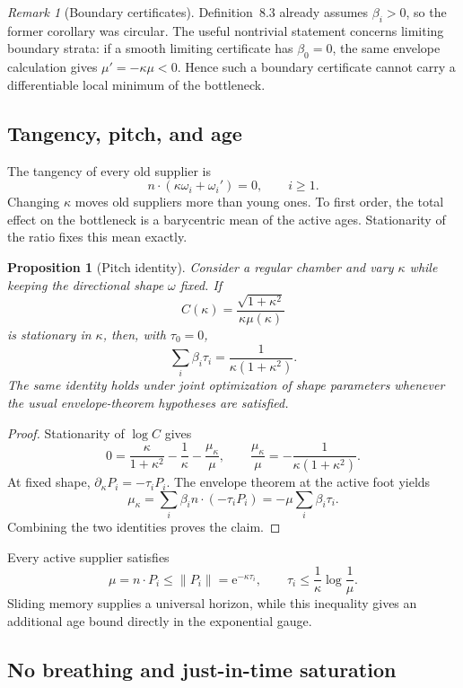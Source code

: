\documentclass[10pt,a4paper]{article}
\newcommand{\e}{\mathrm{e}}
\theoremstyle{plain}
\newtheorem{proposition}[theorem]{Proposition}
\theoremstyle{definition}
\theoremstyle{remark}
\newtheorem{remark}[theorem]{Remark}
\begin{document}
\begin{remark}[Boundary certificates]
Definition~8.3 already assumes $\beta_i>0$, so the former corollary was circular. The useful nontrivial statement concerns limiting boundary strata: if a smooth limiting certificate has $\beta_0=0$, the same envelope calculation gives $\mu'=-\kappa\mu<0$. Hence such a boundary certificate cannot carry a differentiable local minimum of the bottleneck.
\end{remark}

\subsection{Tangency, pitch, and age}

The tangency of every old supplier is
\[
  n\cdot(\kappa\omega_i+\omega_i')=0,
  \qquad i\ge1.
\]
Changing $\kappa$ moves old suppliers more than young ones. To first order, the total effect on the bottleneck is a barycentric mean of the active ages. Stationarity of the ratio fixes this mean exactly.

\begin{proposition}[Pitch identity]
Consider a regular chamber and vary $\kappa$ while keeping the directional shape $\omega$ fixed. If
\[
  C(\kappa)=\frac{\sqrt{1+\kappa^2}}{\kappa\mu(\kappa)}
\]
is stationary in $\kappa$, then, with $\tau_0=0$,
\[
  \sum_i\beta_i\tau_i=\frac{1}{\kappa(1+\kappa^2)}.
\]
The same identity holds under joint optimization of shape parameters whenever the usual envelope-theorem hypotheses are satisfied.
\end{proposition}

\begin{proof}
Stationarity of $\log C$ gives
\[
  0=\frac{\kappa}{1+\kappa^2}-\frac1\kappa-\frac{\mu_\kappa}{\mu},
  \qquad
  \frac{\mu_\kappa}{\mu}=-\frac{1}{\kappa(1+\kappa^2)}.
\]
At fixed shape, $\partial_\kappa P_i=-\tau_iP_i$. The envelope theorem at the active foot yields
\[
  \mu_\kappa
  =\sum_i\beta_i n\cdot(-\tau_iP_i)
  =-\mu\sum_i\beta_i\tau_i.
\]
Combining the two identities proves the claim.
\end{proof}

Every active supplier satisfies
\[
  \mu=n\cdot P_i\le\|P_i\|=\e^{-\kappa\tau_i},
  \qquad
  \tau_i\le\frac1\kappa\log\frac1\mu.
\]
Sliding memory supplies a universal horizon, while this inequality gives an additional age bound directly in the exponential gauge.

\subsection{No breathing and just-in-time saturation}
\end{document}
